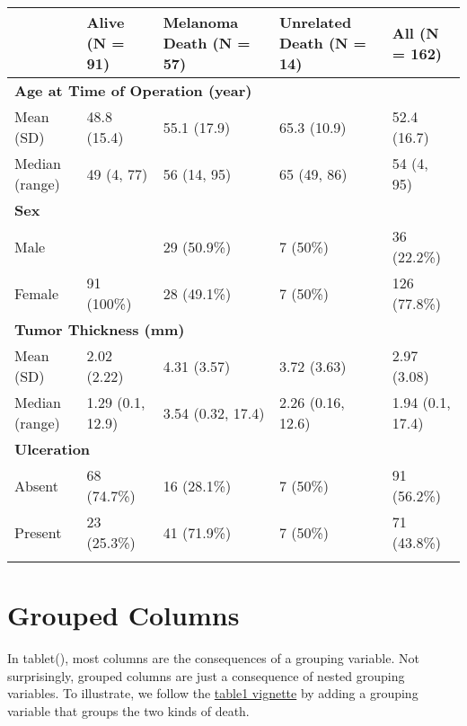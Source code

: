 \documentclass[
]{article}
\begin{document}
\begin{table}[ht]
\centering
\begin{tabular}{lllll}
  \toprule
  & Alive
(N = 91) & Melanoma Death
(N = 57) & Unrelated Death
(N = 14) & All
(N = 162) \\ 
  \midrule
\multicolumn{5}{l}{\!\!\textbf{Age at Time of Operation (year)}}\\
Mean (SD) & 48.8 (15.4) & 55.1 (17.9) & 65.3 (10.9) & 52.4 (16.7) \\ 
  Median (range) & 49 (4, 77) & 56 (14, 95) & 65 (49, 86) & 54 (4, 95) \\ 
   \midrule
\multicolumn{5}{l}{\!\!\textbf{Sex}}\\
Male &  & 29 (50.9\%) & 7 (50\%) & 36 (22.2\%) \\ 
  Female & 91 (100\%) & 28 (49.1\%) & 7 (50\%) & 126 (77.8\%) \\ 
   \midrule
\multicolumn{5}{l}{\!\!\textbf{Tumor Thickness (mm)}}\\
Mean (SD) & 2.02 (2.22) & 4.31 (3.57) & 3.72 (3.63) & 2.97 (3.08) \\ 
  Median (range) & 1.29 (0.1, 12.9) & 3.54 (0.32, 17.4) & 2.26 (0.16, 12.6) & 1.94 (0.1, 17.4) \\ 
   \midrule
\multicolumn{5}{l}{\!\!\textbf{Ulceration}}\\
Absent & 68 (74.7\%) & 16 (28.1\%) & 7 (50\%) & 91 (56.2\%) \\ 
  Present & 23 (25.3\%) & 41 (71.9\%) & 7 (50\%) & 71 (43.8\%) \\ 
   \bottomrule
\multicolumn{5}{l}{}\\
\end{tabular}
\end{table}

\hypertarget{grouped-columns}{%
\section{Grouped Columns}\label{grouped-columns}}

In tablet(), most columns are the consequences of a grouping variable.
Not surprisingly, grouped columns are just a consequence of nested
grouping variables. To illustrate, we follow the
\href{https://CRAN.R-project.org/package=table1}{table1 vignette} by
adding a grouping variable that groups the two kinds of death.
\end{document}
